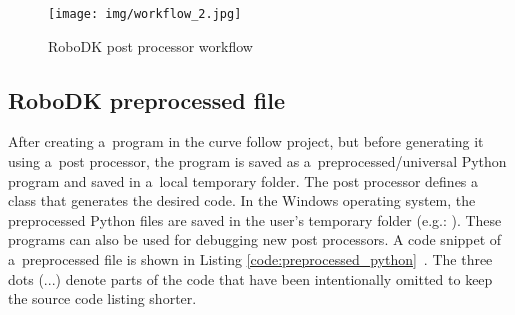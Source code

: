\begin{figure}[h!]
    \centering
    \texttt{[image: img/workflow\_2.jpg]}
    \caption{RoboDK post processor workflow}
    \label{workflow}
\end{figure}


\subsection{RoboDK preprocessed file}

After creating a~program in the curve follow project, but before generating it using a~post processor, the program is saved as a~preprocessed/universal Python program and saved in a~local temporary folder. The post processor defines a~ class that generates the desired code. In the Windows operating system, the preprocessed Python files are saved in the user's temporary folder (e.g.: ). These programs can also be used for debugging new post processors. A code snippet of a~preprocessed file is shown in Listing \ref{code:preprocessed_python}~\cite{preprocessed}. The three dots (...) denote parts of the code that have been intentionally omitted to keep the source code listing shorter. 






